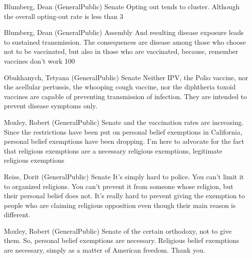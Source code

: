 \begin{result}{26.31935187011756}{Blumberg, Dean (GeneralPublic) Senate}
Opting out tends to cluster. Although the overall opting-out rate is less than 3%
\end{result}

\begin{result}{17.518612732526}{Blumberg, Dean (GeneralPublic) Assembly}
And resulting disease exposure leads to sustained transmission. The consequences are disease among those who choose not to be vaccinated, but also in those who are vaccinated, because, remember vaccines don't work 100%
\end{result}

\begin{result}{12.956579423132006}{Obukhanych, Tetyana (GeneralPublic) Senate}
Neither IPV, the Polio vaccine, nor the acellular pertussis, the whooping cough vaccine, nor the diphtheria toxoid vaccines are capable of preventing transmission of infection. They are intended to prevent disease symptoms only.
\end{result}

\begin{result}{12.287787065500698}{Moxley, Robert (GeneralPublic) Senate}
and the vaccination rates are increasing. Since the restrictions have been put on personal belief exemptions in California, personal belief exemptions have been dropping. I'm here to advocate for the fact that religious exemptions are a necessary religious exemptions, legitimate religious exemptions
\end{result}

\begin{result}{12.208991478716925}{Reiss, Dorit (GeneralPublic) Senate}
It's simply hard to police. You can't limit it to organized religions. You can't prevent it from someone whose religion, but their personal belief does not. It's really hard to prevent giving the exemption to people who are claiming religious opposition even though their main reason is different.
\end{result}

\begin{result}{11.93689502985251}{Moxley, Robert (GeneralPublic) Senate}
of the certain orthodoxy, not to give them. So, personal belief exemptions are necessary. Religious belief exemptions are necessary, simply as a matter of American freedom. Thank you.
\end{result}

